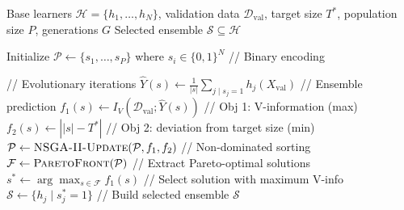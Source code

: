 \begin{algorithm}[t]
\caption{Evolutionary Ensemble Selection via NSGA-II}
\label{alg:evoselect}
\begin{algorithmic}[1]
\Require Base learners $\mathcal{H} = \{h_1, \ldots, h_N\}$, validation data $\mathcal{D}_{\text{val}}$, target size $T^*$, population size $P$, generations $G$
\Ensure Selected ensemble $\mathcal{S} \subseteq \mathcal{H}$

\State Initialize $\mathcal{P} \leftarrow \{s_1, \ldots, s_P\}$ where $s_i \in \{0,1\}^N$ \hfill {\color{gray}// Binary encoding}

 \hfill {\color{gray}// Evolutionary iterations}
     \hfill 
        \State $\hat{Y}(s) \leftarrow \frac{1}{|s|} \sum_{j \mid s_j=1} h_j(X_{\text{val}})$ \hfill {\color{gray}// Ensemble prediction}
        \State $f_1(s) \leftarrow I_V(\mathcal{D}_{\text{val}}; \hat{Y}(s))$ \hfill {\color{gray}// Obj 1: V-information (max)}
        \State $f_2(s) \leftarrow \left| |s| - T^* \right|$ \hfill {\color{gray}// Obj 2: deviation from target size (min)}
    \EndFor
    \State $\mathcal{P} \leftarrow \textsc{NSGA-II-Update}(\mathcal{P}, f_1, f_2)$ \hfill {\color{gray}// Non-dominated sorting}
\EndFor
\Statex
\State $\mathcal{F} \leftarrow \textsc{ParetoFront}(\mathcal{P})$ \hfill {\color{gray}// Extract Pareto-optimal solutions}
\State $s^* \leftarrow \arg\max_{s \in \mathcal{F}} f_1(s)$ \hfill {\color{gray}// Select solution with maximum V-info}
\State $\mathcal{S} \leftarrow \{h_j \mid s^*_j = 1\}$ \hfill {\color{gray}// Build selected ensemble}
\Statex
\State \Return $\mathcal{S}$
\end{algorithmic}
\end{algorithm}